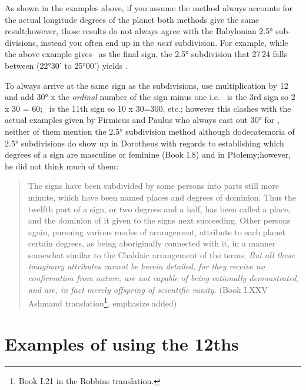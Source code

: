 As shown in the examples above, if you assume the method always accounts for the actual longitude degrees of the planet both methods give the same result;however, those results do not always agree with the Babylonian 2.5° sub-divisions, instead you often end up in the \textsl{next} subdivision. For example, while the above example gives \Capricorn\, as the final sign, the 2.5° subdivision that 27\Aquarius\,24 falls between (22°30' to 25°00') yields \Sagittarius. 

To always arrive at the same sign as the subdivisions, use multiplication by 12 and add 30° x the \textsl{ordinal} number of the sign minus one i.e. \Gemini\, is the 3rd sign so 2 x 30 = 60; \Aquarius\, is the 11th sign so 10 x 30=300, etc.; however this clashes with the actual examples given by Firmicus and Paulus who always cast out 30° for \Aries, neither of them mention the 2.5° subdivision method although dodecatemoria of 2.5° subdivisions do show up in Dorotheus with regards to establishing which degrees of a sign are masculine or feminine (Book I.8) and in Ptolemy;however, he did not think much of them:
\begin{quote}
The signs have been subdivided by some persons into parts still more minute, which have been named places and degrees of dominion. Thus the twelfth part of a sign, or two degrees and a half, has been called a place, and the dominion of it given to the signs next succeeding. Other persons again, pursuing various modes of arrangement, attribute to each planet certain degrees, as being aboriginally connected with it, in a manner somewhat similar to the Chaldaic arrangement of the terms. \textsl{But all these imaginary attributes cannot be herein detailed, for they receive no confirmation from nature, are not capable of being rationally demonstrated, and are, in fact merely offspring of scientific vanity.} (Book I.XXV Ashmand translation\footnote{Book I.21 in the Robbins translation.}, emphasize added)
\end{quote}

\section{Examples of using the 12ths}
